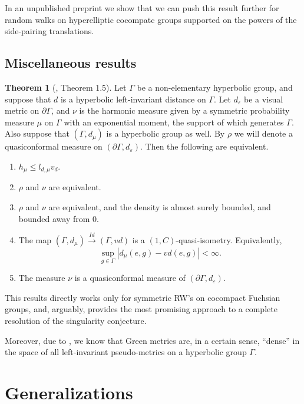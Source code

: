 \documentclass[11pt]{amsart}
\theoremstyle{definition}
\newtheorem{theorem}{Theorem}[section]
\begin{document}
	In an unpublished preprint \cite{kosenko2023asymptotics} we show that we can push this result further for random walks on hyperelliptic cocompatc groups supported on the powers of the side-pairing translations.
 	
	\subsection{Miscellaneous results}
	\begin{theorem}[\cite{blachere2011harmonic}, Theorem 1.5]
		\label{BHMTheorem 1.4}
		Let $\Gamma$ be a non-elementary hyperbolic group, and suppose that $d$ is a hyperbolic left-invariant distance on $\Gamma$. Let $d_\varepsilon$ be a visual metric on $\partial \Gamma$, and $\nu$ is the harmonic measure given by a symmetric probability measure $\mu$ on $\Gamma$ with an exponential moment, the support of which generates $\Gamma$. Also suppose that $(\Gamma, d_\mu)$ is a hyperbolic group as well. By $\rho$ we will denote a quasiconformal measure on $(\partial \Gamma, d_\varepsilon)$. Then the following are equivalent.
		\begin{enumerate}
			\item $h_{\mu} \le l_{d, \mu} v_d$.
			\item $\rho$ and $\nu$ are equivalent.
			\item $\rho$ and $\nu$ are equivalent, and the density is almost surely bounded, and bounded away from 0.
			\item The map $(\Gamma, d_\mu) \xrightarrow{Id} (\Gamma, vd)$ is a $(1, C)$-quasi-isometry. Equivalently,
			\[
			\sup_{g \in \Gamma} |d_\mu(e, g) - vd(e, g)| < \infty.
			\]
			\item The measure $\nu$ is a quasiconformal measure of $(\partial \Gamma, d_\varepsilon)$.
		\end{enumerate}
	\end{theorem}
	This results directly works only for symmetric RW's on cocompact Fuchsian groups, and, arguably, provides the most promising approach to a complete resolution of the singularity conjecture.
	
	Moreover, due to \cite[Theorem 1.1]{cantrell2023manhattan}, we know that Green metrics are, in a certain sense, ``dense'' in the space of all left-invariant pseudo-metrics on a hyperbolic group $\Gamma$.
	
	\section{Generalizations}
\end{document}
